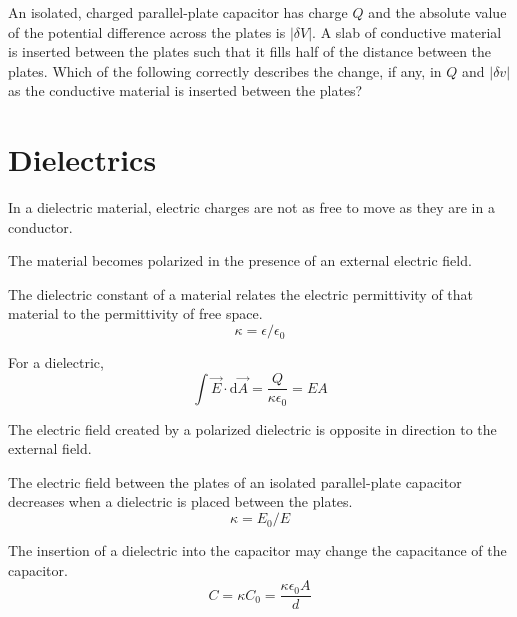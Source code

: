 \documentclass[../em.tex]{subfiles}
\begin{document}
\ex An isolated, charged parallel-plate capacitor has charge $Q$ and the absolute value of the potential difference across the plates is $|\delta V|$. 
A slab of conductive material is inserted between the plates such that it fills half of the distance between the plates. Which of the following correctly describes the change, if any, in $Q$ and $|\delta v|$ as the conductive material is inserted between the plates?

\section{Dielectrics}
In a dielectric material, electric charges are not as free to move as they are in a conductor.

The material becomes polarized in the presence of an external electric field.

The dielectric constant of a material relates the electric permittivity of that material to the permittivity of free space.
\[\kappa = \epsilon/\epsilon_0\]

For a dielectric, 
\[\int \vec{E}\cdot \mathrm{d}\vec{A} = \frac{Q}{\kappa \epsilon_0}=EA \]

The electric field created by a polarized dielectric is opposite in direction to the external field.

The electric field between the plates of an isolated parallel-plate capacitor decreases when a 
dielectric is placed between the plates.
\[\kappa = E_0/E\]

The insertion of a dielectric into the capacitor may change the capacitance of the capacitor.
\[C = \kappa C_0 = \frac{\kappa \epsilon_0 A}{d}\]
\end{document}
